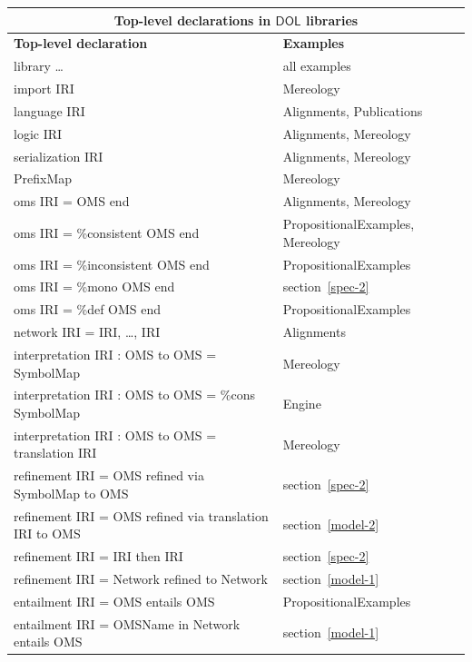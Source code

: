 \documentclass[10pt,fleqn,final]{scrreprt}
\makeatletter
\newcommand*\CommentAuthor{}
\renewcommand*\CommentAuthor{#1}}
\newcommand*\CommentDate{}
\renewcommand*\CommentDate{#1}}
\newcommand*\CommentId{}
\renewcommand*\CommentId{#1}}
\newcommand*\CommentType{}
\renewcommand*\CommentType{#1}}
\newcommand*{\SetCommentColorByType}[1]{%
\edef\localType{{#1}}%
\expandafter\ifstrequal\localType{q-aut}{\colorlet{CommentColor}{red}}{%
\expandafter\ifstrequal\localType{q-all}{\colorlet{CommentColor}{orange}}{%
\expandafter\ifstrequal\localType{todo}{\colorlet{CommentColor}{orange}}{%
\expandafter\ifstrequal\localType{fyi}{\colorlet{CommentColor}{lightgray}}{%
\colorlet{CommentColor}{yellow}}}}}}
\newcommand*{\SetCommentPrefixByType}[1]{%
\edef\localType{{#1}}%
\expandafter\@ifmtarg\localType{%
\edef\CommentPrefix{}%
}{%
\caseupper[q]{#1}%
\edef\CommentPrefix{\thestring: }%
}}
\newcommand*{\initComment}[1]{%
\setkeys{Comment}{#1}%
\SetCommentColorByType{\CommentType}%
\relax%
\SetCommentPrefixByType{\CommentType}%
\relax%
}
\newcommand*{\todonote}[2][]{%
\initComment{#1}%
\pdfcomment[author=\CommentAuthor,color=CommentColor,date=\CommentDate,id=\CommentId]{%
\CommentPrefix
#2}}
\renewcommand*{\todonote}[2][]{%
\initComment{#1}%
\ednote{\CommentPrefix #2}}
\newcommand*{\CLnote}[2][author=Christoph Lange]{%
\todonote[author=Christoph Lange,#1]{#2} 
}
\newcommand*{\DOL}{\ensuremath{\mathsf{DOL}}\xspace}
\makeatother
\begin{document}
\begin{tabular}{|l|l|}\hline
\multicolumn{2}{|c|}{\textbf{Top-level declarations in \DOL libraries}}\\\hline
\textbf{Top-level declaration} & \textbf{Examples} \\\hline
library \ldots & all examples\\\hline
import IRI & Mereology\\\hline
language IRI  & Alignments, Publications \\\hline
logic IRI  & Alignments, Mereology \\\hline
serialization IRI  & Alignments, Mereology \\\hline
PrefixMap  & Mereology \\\hline
oms IRI = OMS end  &  Alignments, Mereology \\\hline
oms IRI = \%consistent OMS end  & PropositionalExamples, Mereology \\\hline
oms IRI = \%inconsistent OMS end  & PropositionalExamples \\\hline
oms IRI = \%mono OMS end  & section~\ref{spec-2} \\\hline
oms IRI = \%def OMS end  & PropositionalExamples \\\hline
network IRI = IRI, \ldots, IRI & Alignments \\\hline
interpretation IRI : OMS to OMS = SymbolMap  & Mereology \\\hline
interpretation IRI : OMS to OMS = \%cons SymbolMap  &  Engine\\\hline
interpretation IRI : OMS to OMS = translation IRI  & Mereology \\\hline
refinement IRI = OMS refined via SymbolMap to OMS & section~\ref{spec-2} \\\hline
refinement IRI = OMS refined via translation IRI to OMS & section~\ref{model-2} \\\hline
refinement IRI = IRI then IRI & section~\ref{spec-2} \\\hline
refinement IRI = Network refined to Network & section~\ref{model-1} \\\hline
entailment IRI = OMS entails OMS & PropositionalExamples \\\hline
entailment IRI = OMSName in Network entails OMS & section~\ref{model-1}\\\hline

\end{tabular}
\end{document}
